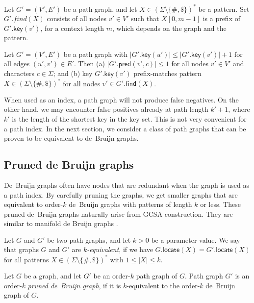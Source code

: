 \documentclass[a4paper,UKenglish]{lipics-v2016}
\newcommand{\set}[1]{\ensuremath{\{ #1 \}}}
\newcommand{\abs}[1]{\ensuremath{\lvert #1 \rvert}}
\newcommand{\find}{\ensuremath{\mathsf{find}}}
\newcommand{\locate}{\ensuremath{\mathsf{locate}}}
\newcommand{\gpred}{\ensuremath{\mathsf{pred}}}
\newcommand{\gkey}{\ensuremath{\mathsf{key}}}
\newcommand{\kequivalent}[1]{$#1$\nobreakdash-equivalent}
\newcommand{\orderk}[1]{order\nobreakdash-$#1$}
\newcommand{\patternset}{\ensuremath{(\Sigma \setminus \set{\#, \$})^{\ast}}}
\begin{document}
\begin{lemma}\label{lemma:pg-context}
Let $G' = (V', E')$ be a path graph, and let $X \in \patternset$ be a pattern. Set $G'.find(X)$ consists of all nodes $v' \in V'$ such that $X[0, m-1]$ is a prefix of $G'.\gkey(v')$, for a context length $m$, which depends on the graph and the pattern.
\end{lemma}

\begin{lemma}\label{lemma:pg-keys}
Let $G' = (V', E')$ be a path graph with $\abs{G'.\gkey(u')} \le \abs{G'.\gkey(v')}+1$ for all edges $(u', v') \in E'$. Then
(a) $\abs{G'.\gpred(v', c)} \le 1$ for all nodes $v' \in V'$ and characters $c \in \Sigma$; and
(b) key $G'.\gkey(v')$ prefix-matches pattern $X \in \patternset$ for all nodes $v' \in G'.\find(X)$.
\end{lemma}

When used as an index, a path graph will not produce false negatives. On the other hand, we may encounter false positives already at path length $k'+1$, where $k'$ is the length of the shortest key in the key set. This is not very convenient for a path index. In the next section, we consider a class of path graphs that can be proven to be equivalent to de~Bruijn graphs.

\subsection{Pruned de Bruijn graphs}

De~Bruijn graphs often have nodes that are redundant when the graph is used as a path index. By carefully pruning the graphs, we get smaller graphs that are equivalent to \orderk{k} de~Bruijn graphs with patterns of length $k$ or less. These pruned de~Bruijn graphs naturally arise from GCSA construction. They are similar to manifold de Bruijn graphs \cite{Lin2014}.

\begin{definition}
Let $G$ and $G'$ be two path graphs, and let $k > 0$ be a parameter value. We say that graphs $G$ and $G'$ are \emph{\kequivalent{k}}, if we have $G.\locate(X) = G'.\locate(X)$ for all patterns $X \in \patternset$ with $1 \le \abs{X} \le k$.
\end{definition}

\begin{definition}
Let $G$ be a graph, and let $G'$ be an \orderk{k} path graph of $G$. Path graph $G'$ is an \orderk{k} \emph{pruned de~Bruijn graph}, if it is \kequivalent{k} to the \orderk{k} de~Bruijn graph of $G$.
\end{definition}
\end{document}
